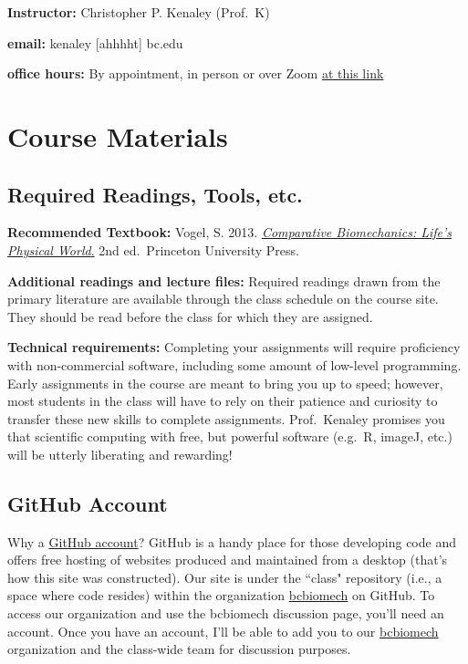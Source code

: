 \documentclass[
]{article}
\begin{document}
\textbf{Instructor:} Christopher P. Kenaley (Prof.~K)

\textbf{email:} kenaley {[}ahhhht{]} bc.edu

\textbf{office hours:} By appointment, in person or over Zoom
\href{https://bccte.zoom.us/j/9533582156}{at this link}

\hypertarget{course-materials}{%
\section{Course Materials}\label{course-materials}}

\hypertarget{required-readings-tools-etc.}{%
\subsection{Required Readings, Tools,
etc.}\label{required-readings-tools-etc.}}

\textbf{Recommended Textbook:} Vogel, S. 2013.
\href{https://www.amazon.com/Comparative-Biomechanics-Lifes-Physical-Second/dp/0691155666\#customerReviews}{\emph{Comparative
Biomechanics: Life's Physical World}.} 2nd ed.~Princeton University
Press.

\textbf{Additional readings and lecture files:} Required readings drawn
from the primary literature are available through the class schedule on
the course site. They should be read before the class for which they are
assigned.

\textbf{Technical requirements:} Completing your assignments will
require proficiency with non-commercial software, including some amount
of low-level programming. Early assignments in the course are meant to
bring you up to speed; however, most students in the class will have to
rely on their patience and curiosity to transfer these new skills to
complete assignments. Prof.~Kenaley promises you that scientific
computing with free, but powerful software (e.g.~R, imageJ, etc.) will
be utterly liberating and rewarding!

\hypertarget{github-account}{%
\subsection{GitHub Account}\label{github-account}}

Why a \href{https://github.com/join}{GitHub account}? GitHub is a handy
place for those developing code and offers free hosting of websites
produced and maintained from a desktop (that's how this site was
constructed). Our site is under the ``class" repository (i.e., a space
where code resides) within the organization
\href{https://github.com/bcbiomech}{bcbiomech} on GitHub. To access our
organization and use the bcbiomech discussion page, you'll need an
account. Once you have an account, I'll be able to add you to our
\href{https://github.com/bcbiomech}{bcbiomech} organization and the
class-wide team for discussion purposes.
\end{document}
